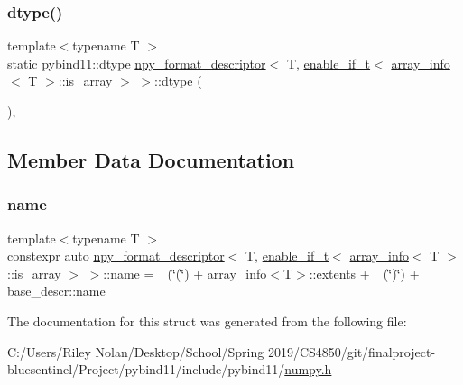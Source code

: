 \subsubsection{\texorpdfstring{dtype()}{dtype()}}
{\footnotesize\ttfamily template$<$typename T $>$ \\
static pybind11\+::dtype \mbox{\hyperlink{structnpy__format__descriptor}{npy\+\_\+format\+\_\+descriptor}}$<$ T, \mbox{\hyperlink{detail_2common_8h_a012819c9e8b5e04872a271f50f8b8196}{enable\+\_\+if\+\_\+t}}$<$ \mbox{\hyperlink{structarray__info}{array\+\_\+info}}$<$ T $>$\+::is\+\_\+array $>$ $>$\+::\mbox{\hyperlink{classdtype}{dtype}} (\begin{DoxyParamCaption}{ }\end{DoxyParamCaption})\hspace{0.3cm}{\ttfamily [inline]}, {\ttfamily [static]}}



\subsection{Member Data Documentation}
\mbox{\label{structnpy__format__descriptor_3_01_t_00_01enable__if__t_3_01array__info_3_01_t_01_4_1_1is__array_01_4_01_4_a82a11b4256cedcd73d222c0e7318abe4}} 
\subsubsection{\texorpdfstring{name}{name}}
{\footnotesize\ttfamily template$<$typename T $>$ \\
constexpr auto \mbox{\hyperlink{structnpy__format__descriptor}{npy\+\_\+format\+\_\+descriptor}}$<$ T, \mbox{\hyperlink{detail_2common_8h_a012819c9e8b5e04872a271f50f8b8196}{enable\+\_\+if\+\_\+t}}$<$ \mbox{\hyperlink{structarray__info}{array\+\_\+info}}$<$ T $>$\+::is\+\_\+array $>$ $>$\+::\mbox{\hyperlink{structname}{name}} = \mbox{\hyperlink{descr_8h_af114703e20c6527e87163eb2798f74b8}{\+\_\+}}(\char`\"{}(\char`\"{}) + \mbox{\hyperlink{structarray__info}{array\+\_\+info}}$<$T$>$\+::extents + \mbox{\hyperlink{descr_8h_af114703e20c6527e87163eb2798f74b8}{\+\_\+}}(\char`\"{})\char`\"{}) + base\+\_\+descr\+::name\hspace{0.3cm}{\ttfamily [static]}}



The documentation for this struct was generated from the following file\+:\begin{DoxyCompactItemize}
\item 
C\+:/\+Users/\+Riley Nolan/\+Desktop/\+School/\+Spring 2019/\+C\+S4850/git/finalproject-\/bluesentinel/\+Project/pybind11/include/pybind11/\mbox{\hyperlink{numpy_8h}{numpy.\+h}}\end{DoxyCompactItemize}
